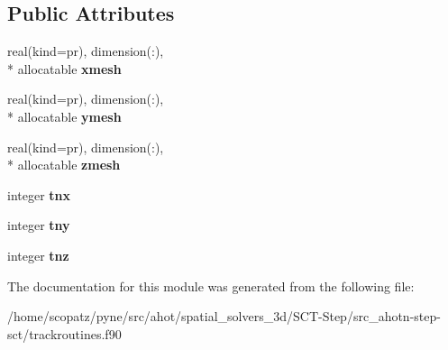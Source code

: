 \subsection*{Public Attributes}
\begin{DoxyCompactItemize}
\item 
\hypertarget{classtracking__routines_a07524d1ef073199189df2a7f7f3fa5ec}{real(kind=pr), dimension(\-:), \\*
allocatable {\bfseries xmesh}}\label{classtracking__routines_a07524d1ef073199189df2a7f7f3fa5ec}

\item 
\hypertarget{classtracking__routines_aa5a1a25601052aa53c95a49839c7caa6}{real(kind=pr), dimension(\-:), \\*
allocatable {\bfseries ymesh}}\label{classtracking__routines_aa5a1a25601052aa53c95a49839c7caa6}

\item 
\hypertarget{classtracking__routines_ad21d114b4233969bbe2985552ff3ddd3}{real(kind=pr), dimension(\-:), \\*
allocatable {\bfseries zmesh}}\label{classtracking__routines_ad21d114b4233969bbe2985552ff3ddd3}

\item 
\hypertarget{classtracking__routines_acbc37a14a1ab16ecf181d9cbc037072d}{integer {\bfseries tnx}}\label{classtracking__routines_acbc37a14a1ab16ecf181d9cbc037072d}

\item 
\hypertarget{classtracking__routines_a1db31d3726c30cc34544ceadeb7dc3d4}{integer {\bfseries tny}}\label{classtracking__routines_a1db31d3726c30cc34544ceadeb7dc3d4}

\item 
\hypertarget{classtracking__routines_a22f4df48f39b50f5ceab6c0c4a076555}{integer {\bfseries tnz}}\label{classtracking__routines_a22f4df48f39b50f5ceab6c0c4a076555}

\end{DoxyCompactItemize}


The documentation for this module was generated from the following file\-:\begin{DoxyCompactItemize}
\item 
/home/scopatz/pyne/src/ahot/spatial\-\_\-solvers\-\_\-3d/\-S\-C\-T-\/\-Step/src\-\_\-ahotn-\/step-\/sct/trackroutines.\-f90\end{DoxyCompactItemize}
